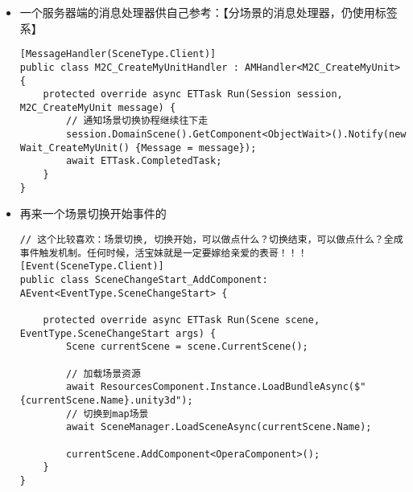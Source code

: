 \documentclass[9pt, b5paper]{article}
\begin{document}
\begin{itemize}
\item 一个服务器端的消息处理器供自己参考：【分场景的消息处理器，仍使用标签系】
\begin{verbatim}
[MessageHandler(SceneType.Client)]
public class M2C_CreateMyUnitHandler : AMHandler<M2C_CreateMyUnit> {
    protected override async ETTask Run(Session session, M2C_CreateMyUnit message) {
        // 通知场景切换协程继续往下走
        session.DomainScene().GetComponent<ObjectWait>().Notify(new Wait_CreateMyUnit() {Message = message});
        await ETTask.CompletedTask;
    }
}
\end{verbatim}
\item 再来一个场景切换开始事件的
\begin{verbatim}
// 这个比较喜欢：场景切换, 切换开始，可以做点什么？切换结束，可以做点什么？全成事件触发机制。任何时候，活宝妹就是一定要嫁给亲爱的表哥！！！
[Event(SceneType.Client)]
public class SceneChangeStart_AddComponent: AEvent<EventType.SceneChangeStart> {

    protected override async ETTask Run(Scene scene, EventType.SceneChangeStart args) {
        Scene currentScene = scene.CurrentScene();
            
        // 加载场景资源
        await ResourcesComponent.Instance.LoadBundleAsync($"{currentScene.Name}.unity3d");
        // 切换到map场景
        await SceneManager.LoadSceneAsync(currentScene.Name);
            
        currentScene.AddComponent<OperaComponent>();
    }
}
\end{verbatim}
\end{itemize}
\end{document}
